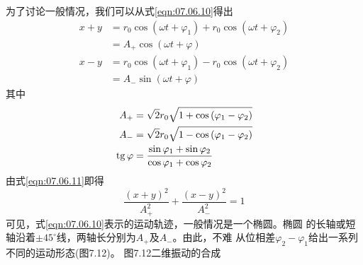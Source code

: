 为了讨论一般情况，我们可以从式\eqref{eqn:07.06.10}得出
\begin{equation}\label{eqn:07.06.11}
    \begin{split}
        x + y &= r _ { 0 }  \cos \left( \omega t + \varphi _ { 1 } \right) + r _ { 0 }  \cos \left( \omega t +  \varphi _ { 2 } \right)  \\
        &= A _ { + }  \cos \left( \omega t + \varphi \right) \\
        x - y &= r _ { 0 }  \cos \left( \omega t +  \varphi _ { 1 } \right) - r _ { 0 }  \cos \left( \omega t +  \varphi _ { 2 } \right)  \\
        &= A _ { - }  \sin \left( \omega t + \varphi \right)
    \end{split}
\end{equation}
其中
\begin{equation}\label{eqn:07.06.12}
    \begin{split}
        A _ { + } &= \sqrt { 2 } r _ { 0 } \sqrt { 1 + \cos \left( \varphi _ { 1 } -  \varphi _ { 2 } \right) }  \\
        A _ { - } &= \sqrt { 2 } r _ { 0 } \sqrt { 1 - \cos \left( \varphi _ { 1 } -  \varphi _ { 2 } \right) } \\
        \operatorname{tg} \varphi &= \frac { \sin \varphi _ { 1 } + \sin \varphi _ { 2 } } { \cos \varphi _ { 1 } + \cos \varphi _ { 2 } }
    \end{split}
\end{equation}
由式\eqref{eqn:07.06.11}即得
\begin{equation*}
    \frac { \left( x + y \right) ^ { 2 } } { A _ { + } ^ { 2 } } + \frac { \left( x - y \right) ^ { 2 } } { A _ { - } ^ { 2 } } = 1
\end{equation*}
可见，式\eqref{eqn:07.06.10}表示的运动轨迹，一般情况是一个椭圆。椭圆
的长轴或短轴沿着$ \pm 45 ^ { \circ } $线，两轴长分别为$ A _ { + } $及$ A _ { - } $。由此，不难
从位相差$ \varphi_{ 2 } - \varphi_{ 1 } $给出一系列不同的运动形态(图7.12)。
\clearpage
图7.12二维振动的合成

